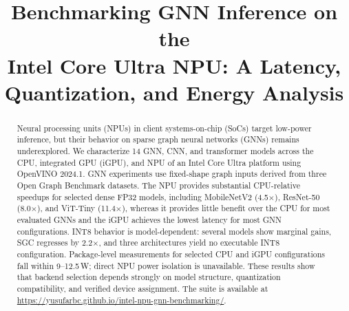 \documentclass[conference]{IEEEtran}
\begin{document}
\title{Benchmarking GNN Inference on the\\
Intel Core Ultra NPU: A Latency,\\
Quantization, and Energy Analysis}

\author{
\and
{}
\and
{}
}

\maketitle

\begin{abstract}
Neural processing units (NPUs) in client systems-on-chip (SoCs) target low-power inference, but their behavior on sparse graph neural networks (GNNs) remains underexplored. We characterize 14 GNN, CNN, and transformer models across the CPU, integrated GPU (iGPU), and NPU of an Intel Core Ultra platform using OpenVINO 2024.1. GNN experiments use fixed-shape graph inputs derived from three Open Graph Benchmark datasets. The NPU provides substantial CPU-relative speedups for selected dense FP32 models, including MobileNetV2 (4.5$\times$), ResNet-50 (8.0$\times$), and ViT-Tiny (11.4$\times$), whereas it provides little benefit over the CPU for most evaluated GNNs and the iGPU achieves the lowest latency for most GNN configurations. INT8 behavior is model-dependent: several models show marginal gains, SGC regresses by 2.2$\times$, and three architectures yield no executable INT8 configuration. Package-level measurements for selected CPU and iGPU configurations fall within 9--12.5\,W; direct NPU power isolation is unavailable. These results show that backend selection depends strongly on model structure, quantization compatibility, and verified device assignment. The suite is available at \url{https://yusufarbc.github.io/intel-npu-gnn-benchmarking/}.
\end{abstract}
\end{document}
